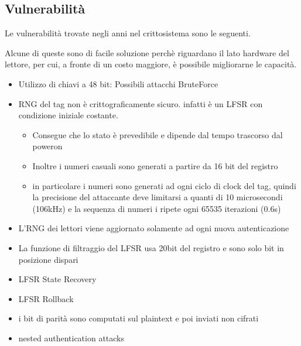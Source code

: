 \subsection{Vulnerabilità}

\begin{frame}
    Le vulnerabilità trovate negli anni nel crittosistema sono le seguenti.

    Alcune di queste sono di facile soluzione perchè riguardano il lato hardware del lettore,
    per cui, a fronte di un costo maggiore, è possibile migliorarne le capacità.
\end{frame}

\begin{frame}
    \scriptsize
    \begin{itemize}
        \item <1-> Utilizzo di chiavi a 48 bit: Possibili attacchi BruteForce \cite{courtois2008algebraic}
        \item <2-> RNG del tag non è crittograficamente sicuro. infatti è un LFSR con condizione iniziale costante.
        \begin{itemize} \scriptsize
            \item <3-> Consegue che lo stato è prevedibile e dipende dal tempo trascorso dal poweron~\cite{garcia2008dismantling}\cite{courtois2008algebraic}
            \item <4-> Inoltre i numeri casuali sono generati a partire da 16 bit del registro 
            \item <5-> in particolare i numeri sono generati ad ogni ciclo di clock del tag, quindi la precisione del attaccante deve limitarsi a quanti di 10 microsecondi (106kHz) e la sequenza di numeri i ripete ogni 65535 iterazioni (0.6s)
        \end{itemize}
        \item <6-> L'RNG dei lettori viene aggiornato solamente ad ogni nuova autenticazione~\cite{garcia2008dismantling}
        \item <7-> La funzione di filtraggio del LFSR usa 20bit del registro e sono solo bit in posizione dispari
        \item <8-> LFSR State Recovery
        \item <9-> LFSR Rollback
        \item <10-> i bit di parità sono computati sul plaintext e poi inviati non cifrati
        \item <11-> nested authentication attacks
    \end{itemize}
\end{frame}


